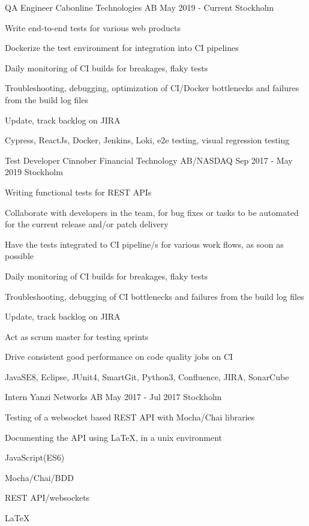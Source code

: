 \documentclass[11pt, a4paper]{awesome-cv}
\begin{document}
\begin{cventries}
    \cventry
      {QA Engineer}
      {Cabonline Technologies AB}
      {May 2019 - Current}
      {Stockholm}
      {
        \begin{cvitems}
          \item Write end-to-end tests for various web products
          \item Dockerize the test environment for integration into CI pipelines
          \item Daily monitoring of CI builds for breakages, flaky tests
          \item Troubleshooting, debugging, optimization of CI/Docker bottlenecks and failures from the build log files
          \item Update, track backlog on JIRA
          \item Cypress, ReactJs, Docker, Jenkins, Loki, e2e testing, visual regression testing
        \end{cvitems}
      }

    \cventry
      {Test Developer}
      {Cinnober Financial Technology AB/NASDAQ}
      {Sep 2017 - May 2019}
      {Stockholm}
      {
        \begin{cvitems}
          \item Writing functional tests for REST APIs
          \item Collaborate with developers in the team, for bug fixes or tasks to be automated
          for the current release and/or patch delivery
          \item Have the tests integrated to CI pipeline/s for various work flows, as soon as possible
          \item Daily monitoring of CI builds for breakages, flaky tests
          \item Troubleshooting, debugging of CI bottlenecks and failures from the build log files
          \item Update, track backlog on JIRA
          \item Act as scrum master for testing sprints
          \item Drive consistent good performance on code quality jobs on CI
          \item JavaSE8, Eclipse, JUnit4, SmartGit, Python3, Confluence, JIRA, SonarCube
        \end{cvitems}
      }

    \cventry
      {Intern}
      {Yanzi Networks AB}
      {May 2017 - Jul 2017}
      {Stockholm}
      {
        \begin{cvitems}
          \item Testing of a websocket based REST API with Mocha/Chai libraries
          \item Documenting the API using LaTeX, in a unix environment
          \item JavaScript(ES6)
          \item Mocha/Chai/BDD
          \item REST API/websockets
          \item LaTeX
          \end{cvitems}
      }



\end{cventries}
\end{document}
